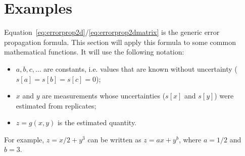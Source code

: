 \section{Examples}
\label{sec:errorpropexamples}

Equation~\ref{eq:errorprop2d}/\ref{eq:errorprop2dmatrix} is the
generic error propagation formula. This section will apply this
formula to some common mathematical functions. It will use the
following notation:

\begin{itemize}
\item{$a, b, c, \ldots$} are constants, i.e. values that are known
  without uncertainty ($s[a]=s[b]=s[c]=0$);
\item{$x$ and $y$} are measurements whose uncertainties ($s[x]$ and
  $s[y]$) were estimated from replicates;
\item{$z = g(x,y)$} is the estimated quantity.
\end{itemize}

\noindent For example, $z = x/2 + y^3$ can be written as $z = a x +
y^b$, where $a=1/2$ and $b=3$.

